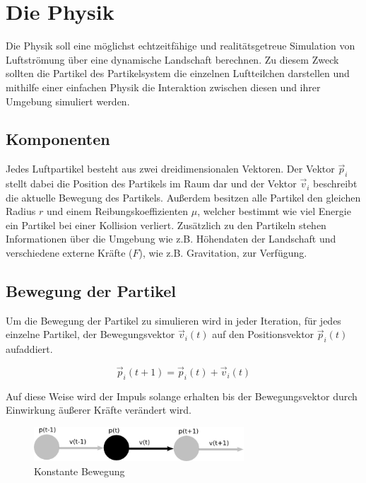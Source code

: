 \section{Die Physik}
\begin{Spacing}{\mylinespace}
    Die Physik soll eine möglichst echtzeitfähige und
    realitätsgetreue Simulation von Luftströmung über eine dynamische Landschaft berechnen.
    Zu diesem Zweck sollten die Partikel des Partikelsystem die einzelnen
    Luftteilchen darstellen und mithilfe einer einfachen Physik
    die Interaktion zwischen diesen und ihrer Umgebung simuliert werden.
    \subsection{Komponenten}
        Jedes Luftpartikel besteht aus zwei dreidimensionalen Vektoren.
        Der Vektor $\vec{p}_{i}$ stellt dabei die Position des Partikels im
        Raum dar und der Vektor $\vec{v}_{i}$ beschreibt die aktuelle Bewegung des Partikels.
        Außerdem besitzen alle Partikel den gleichen Radius $r$ und einem
        Reibungskoeffizienten $\mu$, welcher bestimmt wie viel Energie ein Partikel
        bei einer Kollision verliert.
        Zusätzlich zu den Partikeln stehen Informationen über die Umgebung
        wie z.B. Höhendaten der Landschaft und verschiedene externe
        Kräfte ($F$), wie z.B. Gravitation, zur Verfügung.



    \subsection{Bewegung der Partikel}
        Um die Bewegung der Partikel zu simulieren wird in jeder Iteration,
        für jedes einzelne Partikel, der Bewegungsvektor $\vec{v}_{i}(t)$
        auf den Positionsvektor $ \vec{p}_{i}(t)$ aufaddiert.

        \[ \vec{p}_{i}(t+1) = \vec{p}_{i}(t) + \vec{v}_{i}(t) \]

        Auf diese Weise wird der Impuls solange erhalten bis der Bewegungsvektor
        durch Einwirkung äußerer Kräfte verändert wird.

        \begin{figure}[h!]
			\centering
			\vspace*{30px}
			\includegraphics[width=0.7\textwidth]{graphics/Phys_bew0.png}
			\caption{Konstante Bewegung}
			\label{fig:BewegungPartikel}
		\end{figure}


\end{Spacing}
